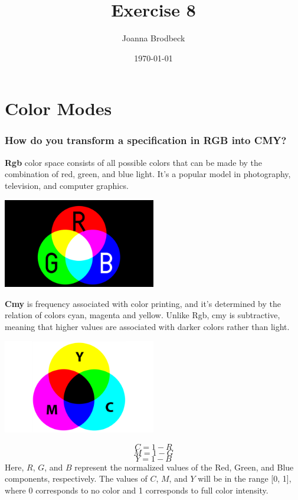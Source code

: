 \documentclass{article}
\title{Exercise 8}
\author{Joanna Brodbeck}
\date{\today}
\begin{document}
\maketitle

\section{Color Modes}
\subsubsection*{How do you transform a specification in RGB into CMY?}
\textbf{Rgb} color space consists of all possible colors that can be made by the combination of red, green, and blue light. It's a popular model in photography, television, and computer graphics.\\
\begin{center}
    \includegraphics[width=0.5\textwidth]{assets/rgb.png}
\end{center}
\textbf{Cmy} is frequency associated with color printing, and it's determined by the relation of colors cyan, magenta and yellow. Unlike Rgb, cmy is subtractive, meaning that higher values are associated with darker colors rather than light.
\begin{center}
    \includegraphics[width=0.5\textwidth]{assets/ymc.png}
\end{center}
\[
C = 1 - R
\]
\[
M = 1 - G
\]
\[
Y = 1 - B
\]
Here, \( R \), \( G \), and \( B \) represent the normalized values of the Red, Green, and Blue components, respectively. The values of \( C \), \( M \), and \( Y \) will be in the range [0, 1], where 0 corresponds to no color and 1 corresponds to full color intensity.
\end{document}
